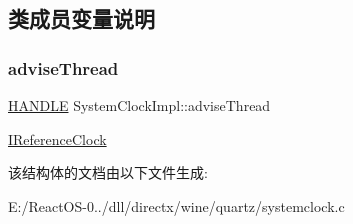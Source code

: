 \subsection{类成员变量说明}
\mbox{\label{struct_system_clock_impl_a2df1a6a4c11cbffcade7c93d44ca6b72}} 
\subsubsection{\texorpdfstring{advise\+Thread}{adviseThread}}
{\footnotesize\ttfamily \hyperlink{interfacevoid}{H\+A\+N\+D\+LE} System\+Clock\+Impl\+::advise\+Thread}

\hyperlink{interface_i_reference_clock}{I\+Reference\+Clock} 

该结构体的文档由以下文件生成\+:\begin{DoxyCompactItemize}
\item 
E\+:/\+React\+O\+S-\/0../dll/directx/wine/quartz/systemclock.\+c\end{DoxyCompactItemize}
